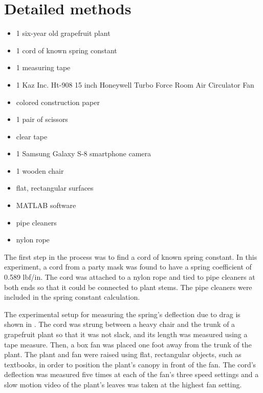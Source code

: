 \section{Detailed methods}
\label{app:A}

\begin{itemize}
\item 1 six-year old grapefruit plant
\item 1 cord of known spring constant
\item 1 measuring tape
\item 1 Kaz Inc. Ht-908 15 inch Honeywell Turbo Force Room Air Circulator Fan
\item colored construction paper
\item 1 pair of scissors
\item clear tape
\item 1 Samsung Galaxy S-8 smartphone camera
\item 1 wooden chair
\item flat, rectangular surfaces
\item MATLAB software
\item pipe cleaners
\item nylon rope
\end{itemize}

The first step in the process was to find a cord of known spring constant. In this experiment, a cord from a party mask was found to have a spring coefficient of 0.589 lbf/in. The cord was attached to a nylon rope and tied to pipe cleaners at both ends so that it could be connected to plant stems. The pipe cleaners were included in the spring constant calculation.

The experimental setup for measuring the spring's deflection due to drag is shown in . The cord was strung between a heavy chair and the trunk of a grapefruit plant so that it was not slack, and its length was measured using a tape measure. Then, a box fan was placed one foot away from the trunk of the plant. The plant and fan were raised using flat, rectangular objects, such as textbooks, in order to position the plant's canopy in front of the fan. The cord's deflection was measured five times at each of the fan's three speed settings and a slow motion video of the plant's leaves was taken at the highest fan setting.

